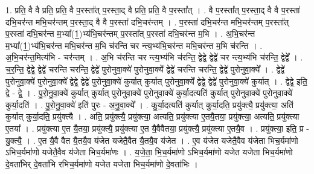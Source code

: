 \documentclass[17pt]{extarticle}
\begin{document}
1. प्रति॒ वै वै प्रति॒ प्रति॒ वै प॒रस्ता᳚त् प॒रस्ता॒द् वै प्रति॒ प्रति॒ वै प॒रस्ता᳚त् । . वै प॒रस्ता᳚त् प॒रस्ता॒द् वै वै प॒रस्ता॑ दभि॒चर॑न्त मभि॒चर॑न्तम् प॒रस्ता॒द् वै वै प॒रस्ता॑ दभि॒चर॑न्तम् । . प॒रस्ता॑ दभि॒चर॑न्त मभि॒चर॑न्तम् प॒रस्ता᳚त् प॒रस्ता॑ दभि॒चर॑न्त म॒भ्या᳚(1॒)भ्य॑भि॒चर॑न्तम् प॒रस्ता᳚त् प॒रस्ता॑ दभि॒चर॑न्त म॒भि । . अ॒भि॒चर॑न्त म॒भ्या᳚(1॒)भ्य॑भि॒चर॑न्त मभि॒चर॑न्त म॒भि च॑रन्ति चर न्त्य॒भ्य॑भि॒चर॑न्त मभि॒चर॑न्त म॒भि च॑रन्ति । . अ॒भि॒चर॑न्त॒मित्य॑भि - चर॑न्तम् । . अ॒भि च॑रन्ति चर न्त्य॒भ्य॑भि च॑रन्ति॒ द्वेद्वे॒ द्वेद्वे॑ चर न्त्य॒भ्य॑भि च॑रन्ति॒ द्वेद्वे᳚ । . च॒र॒न्ति॒ द्वेद्वे॒ द्वेद्वे॑ चरन्ति चरन्ति॒ द्वेद्वे॑ पुरोनुवा॒क्ये॑ पुरोनुवा॒क्ये᳚ द्वेद्वे॑ चरन्ति चरन्ति॒ द्वेद्वे॑ पुरोनुवा॒क्ये᳚ । . द्वेद्वे॑ पुरोनुवा॒क्ये॑ पुरोनुवा॒क्ये᳚ द्वेद्वे॒ द्वेद्वे॑ पुरोनुवा॒क्ये॑ कुर्यात् कुर्यात् पुरोनुवा॒क्ये᳚ द्वेद्वे॒ द्वेद्वे॑ पुरोनुवा॒क्ये॑ कुर्यात् । . द्वेद्वे॒ इति॒ द्वे - द्वे॒ । . पु॒रो॒नु॒वा॒क्ये॑ कुर्यात् कुर्यात् पुरोनुवा॒क्ये॑ पुरोनुवा॒क्ये॑ कुर्या॒दत्यति॑ कुर्यात् पुरोनुवा॒क्ये॑ पुरोनुवा॒क्ये॑ कुर्या॒दति॑ । . पु॒रो॒नु॒वा॒क्ये॑ इति॑ पुरः - अ॒नु॒वा॒क्ये᳚ । . कु॒र्या॒दत्यति॑ कुर्यात् कुर्या॒दति॒ प्रयु॑क्त्यै॒ प्रयु॑क्त्या॒ अति॑ कुर्यात् कुर्या॒दति॒ प्रयु॑क्त्यै । . अति॒ प्रयु॑क्त्यै॒ प्रयु॑क्त्या॒ अत्यति॒ प्रयु॑क्त्या ए॒तयै॒तया॒ प्रयु॑क्त्या॒ अत्यति॒ प्रयु॑क्त्या ए॒तया᳚ । . प्रयु॑क्त्या ए॒त यै॒तया॒ प्रयु॑क्त्यै॒ प्रयु॑क्त्या ए॒त यै॒वैवैतया॒ प्रयु॑क्त्यै॒ प्रयु॑क्त्या ए॒तयै॒व । . प्रयु॑क्त्या॒ इति॒ प्र - यु॒क्त्यै॒ । . ए॒त यै॒वै वैत यै॒तयै॒व य॑जेत यजेतै॒वैत यै॒तयै॒व य॑जेत । . ए॒व य॑जेत यजेतै॒वैव य॑जेता भिच॒र्यमा॑णो ऽभिच॒र्यमा॑णो यजेतै॒वैव य॑जेता भिच॒र्यमा॑णः । . य॒जे॒ता॒ भि॒च॒र्यमा॑णो ऽभिच॒र्यमा॑णो यजेत यजेता भिच॒र्यमा॑णो दे॒वता॑भिर् दे॒वता॑भि रभिच॒र्यमा॑णो यजेत यजेता भिच॒र्यमा॑णो दे॒वता॑भिः । \newline
\end{document}

